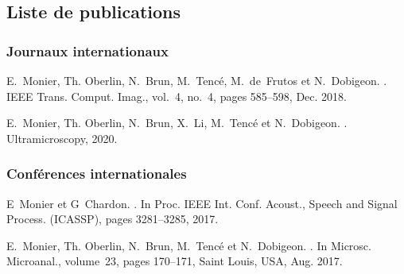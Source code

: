 \begin{fullwidth}
    \chapter*{Liste de publications}\label{ch-liste-publis}
    
    \subsection*{Journaux internationaux}
    

        E.~Monier, Th. Oberlin, N.~Brun, M.~Tenc\'e, M.~de~Frutos et N.~Dobigeon.
        .
        \newblock IEEE Trans. Comput. Imag., vol.~4, no.~4, pages 585--598, Dec. 2018.

        E.~Monier, Th. Oberlin, N.~Brun, X.~Li, M.~Tenc\'e et N.~Dobigeon.
        .
        \newblock Ultramicroscopy, 2020.


    \subsection*{Conférences internationales}
    

        E~Monier et G~Chardon.
        .
        \newblock In Proc. IEEE Int. Conf. Acoust., Speech and Signal Process.
          (ICASSP), pages 3281--3285, 2017.

        E.~Monier, Th. Oberlin, N.~Brun, M.~Tenc\'e et N.~Dobigeon.
        .
        \newblock In Microsc. Microanal., volume~23, pages 170--171, Saint Louis, USA,
          Aug. 2017.


\end{fullwidth}
